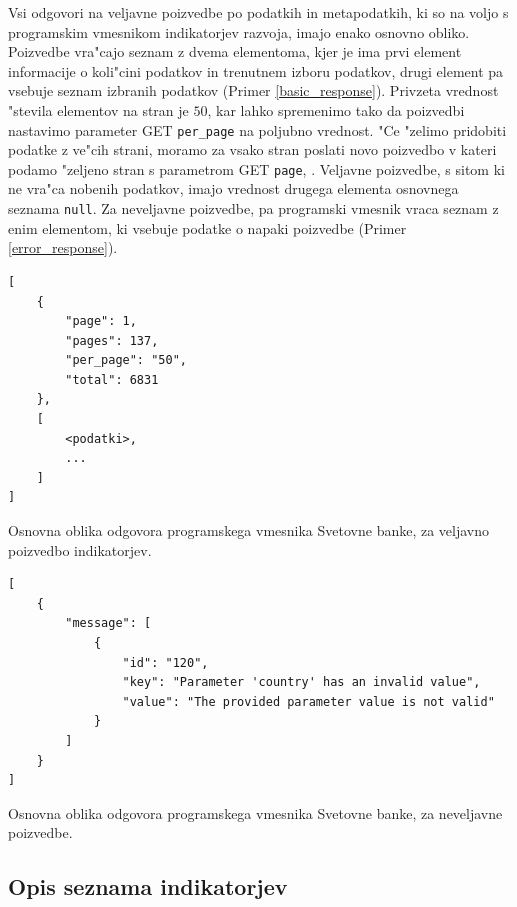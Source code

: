 Vsi odgovori na veljavne poizvedbe po podatkih in metapodatkih, ki so na voljo
s programskim vmesnikom indikatorjev razvoja, imajo enako osnovno obliko. 
Poizvedbe vra"cajo seznam z dvema elementoma, kjer je ima prvi element 
informacije o koli"cini podatkov in trenutnem izboru podatkov, drugi element 
pa vsebuje seznam izbranih podatkov (Primer \ref{basic_response}). Privzeta
vrednost "stevila elementov na stran je $50$, kar lahko spremenimo tako da
poizvedbi nastavimo parameter GET \verb|per_page| na poljubno vrednost. "Ce
"zelimo pridobiti podatke z ve"cih strani, moramo za vsako stran poslati novo
poizvedbo v kateri podamo "zeljeno stran s parametrom GET \verb|page|, . 
Veljavne poizvedbe, s sitom ki ne vra"ca nobenih podatkov, imajo vrednost 
drugega elementa osnovnega seznama \verb|null|.
Za neveljavne poizvedbe, pa programski vmesnik vraca seznam z enim elementom,
ki vsebuje podatke o napaki poizvedbe (Primer \ref{error_response}).


\begin{snippet}
\begin{center}
\begin{lstlisting}
[
    {
        "page": 1,
        "pages": 137,
        "per_page": "50",
        "total": 6831
    },
    [
        <podatki>,
        ...
    ]
]
\end{lstlisting}
\end{center}
\caption{Osnovna oblika odgovora programskega vmesnika Svetovne banke, za
veljavno poizvedbo indikatorjev.} 
\label{basic_response}
\end{snippet} 


\begin{snippet}
\begin{center}
\begin{lstlisting}
[
    {
        "message": [
            {
                "id": "120",
                "key": "Parameter 'country' has an invalid value",
                "value": "The provided parameter value is not valid"
            }
        ]
    }
]
\end{lstlisting}
\end{center}
\caption{Osnovna oblika odgovora programskega vmesnika Svetovne banke, za
neveljavne poizvedbe.}
\label{error_response}
\end{snippet} 


\subsection{Opis seznama indikatorjev}


